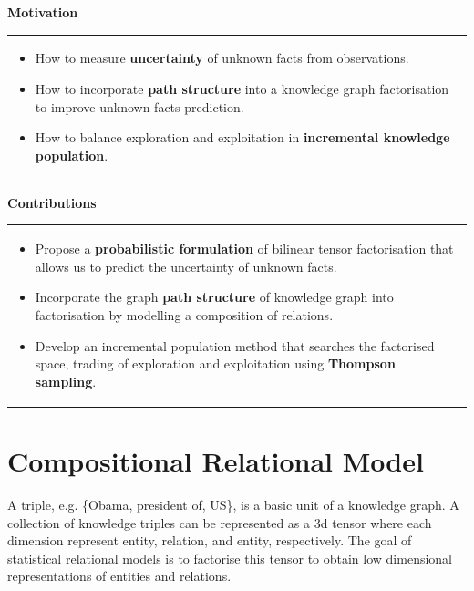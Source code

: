 \documentclass[a0,landscape]{a0poster}
\newcommand{\itemup}{\vspace{-.5cm}}
\begin{document}
\begin{multicols}{3}
\small

\color{DarkSlateGray}

\noindent\textbf{\Large Motivation}

\vspace{.2cm}

\begin{tabular}{p{\linewidth}}
\cellcolor{DarkSlateGray}
\color{white}
\begin{itemize}
\itemup
\item How to measure \textbf{uncertainty} of unknown facts from observations.
\item How to incorporate \textbf{path structure} into a knowledge graph factorisation to improve  unknown facts prediction.
\item How to balance exploration and exploitation in \textbf{incremental knowledge population}.
\itemup
\end{itemize}
\end{tabular}

\vspace{.5cm}

\noindent\textbf{\Large Contributions}

\vspace{.2cm}

\begin{tabular}{p{\linewidth}}
\cellcolor{DarkSlateGray}
\color{white}
\begin{itemize}
\itemup
\item Propose a \textbf{probabilistic formulation} of bilinear tensor factorisation that allows us to predict the uncertainty of unknown facts.
\item Incorporate the graph \textbf{path structure} of knowledge graph into factorisation by modelling a composition of relations.
\item Develop an incremental population method that searches the factorised space, trading of exploration and exploitation using \textbf{Thompson sampling}.
\itemup
\end{itemize}
\end{tabular}



\color{Black}


\section{Compositional Relational Model}
A triple, e.g. \{Obama, president of, US\}, is a basic unit of a knowledge graph. A collection of knowledge triples can be represented as a 3d tensor where each dimension represent entity, relation, and entity, respectively. The goal of statistical relational models is to factorise this tensor to obtain low dimensional representations of entities and relations.


\end{multicols}
\end{document}

